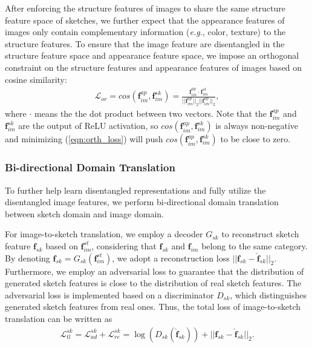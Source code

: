 \documentclass[10pt,twocolumn,letterpaper]{article}
\begin{document}
After enforcing the structure features of images to share the same structure feature space of sketches, we further expect that the appearance features of images only contain complementary information (\emph{e.g.}, color, texture) to the structure features.
To ensure that the image feature are disentangled in the structure feature space and appearance feature space, we impose an orthogonal constraint on the structure features and appearance features of images based on cosine similarity:
\vspace{-4pt}
\begin{align} \label{eqn:orth_loss}
    \mathcal{L}_{or} = cos(\mathbf{f}_{im}^{ap}, \mathbf{f}_{im}^{sk}) = \frac{\mathbf{f}_{im}^{ap} \cdot \mathbf{f}_{im}^{st}}{||\mathbf{f}_{im}^{ap}||_2 ||\mathbf{f}_{im}^{ap}||_2},
\end{align}
where $\cdot$ means the the dot product between two vectors.
Note that the $\mathbf{f}_{im}^{ap}$ and $\mathbf{f}_{im}^{sk}$ are the output of ReLU activation, so $cos(\mathbf{f}_{im}^{ap}, \mathbf{f}_{im}^{sk})$ is always non-negative and minimizing (\ref{eqn:orth_loss}) will push $cos(\mathbf{f}_{im}^{ap}, \mathbf{f}_{im}^{sk})$ to be close to zero.

\subsubsection{Bi-directional Domain Translation}
To further help learn disentangled representations and fully utilize the disentangled image features, we perform bi-directional domain translation between sketch domain and image domain.

For image-to-sketch translation, we employ a decoder $G_{sk}$ to reconstruct sketch feature $\mathbf{f}_{sk}$ based on $\mathbf{f}_{im}^{st}$, considering that $\mathbf{f}_{sk}$ and $\mathbf{f}_{im}$ belong to the same category. By denoting $\hat{\mathbf{f}}_{sk} = G_{sk}(\mathbf{f}_{im}^{st})$, we adopt a reconstruction loss $||\mathbf{f}_{sk}-\hat{\mathbf{f}}_{sk}||_2$. Furthermore, we employ an adversarial loss to guarantee that the distribution of generated sketch features is close to the distribution of real sketch features. The adversarial loss is implemented based on a discriminator $D_{sk}$, which distinguishes generated sketch features from real ones. Thus, the total loss of image-to-sketch translation can be written as 
\vspace{-4pt}
\begin{align} \label{eqn:5}
    \mathcal{L}_{tl}^{sk}\!=\!\mathcal{L}_{ad}^{sk}\!+\!\mathcal{L}_{re}^{sk}\!=\!\log(D_{sk}(\hat{\mathbf{f}}_{sk}))\!+\!||\mathbf{f}_{sk}-\hat{\mathbf{f}}_{sk}||_2.
\end{align}
\end{document}
